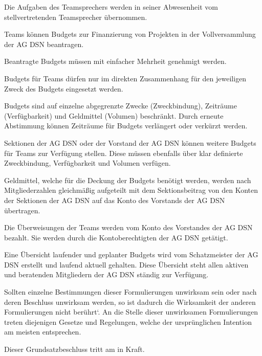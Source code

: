 \begin{contract}
Die Aufgaben des Teamsprechers werden in seiner Abwesenheit vom stellvertretenden Teamsprecher übernommen.


Teams können Budgets zur Finanzierung von Projekten in der Vollversammlung der AG DSN beantragen.

Beantragte Budgets müssen mit einfacher Mehrheit genehmigt werden.

Budgets für Teams dürfen nur im direkten Zusammenhang für den jeweiligen Zweck des Budgets eingesetzt werden.

Budgets sind auf einzelne abgegrenzte Zwecke (Zweckbindung), Zeiträume (Verfügbarkeit) und Geldmittel (Volumen) beschränkt. Durch erneute Abstimmung können Zeiträume für Budgets verlängert oder verkürzt werden.

Sektionen der AG DSN oder der Vorstand der AG DSN können weitere Budgets für Teams zur Verfügung stellen. Diese müssen ebenfalls über klar definierte Zweckbindung, Verfügbarkeit und Volumen verfügen.

Geldmittel, welche für die Deckung der Budgets benötigt werden, werden nach Mitgliederzahlen gleichmäßig aufgeteilt mit dem Sektionsbeitrag von den Konten der Sektionen der AG DSN auf das Konto des Vorstands der AG DSN übertragen.

Die Überweisungen der Teams werden vom Konto des Vorstandes der AG DSN bezahlt. Sie werden durch die Kontoberechtigten der AG DSN getätigt.

Eine Übersicht laufender und geplanter Budgets wird vom Schatzmeister der AG DSN erstellt und laufend aktuell gehalten. Diese Übersicht steht allen aktiven und beratenden Mitgliedern der AG DSN ständig zur Verfügung.

Sollten einzelne Bestimmungen dieser Formulierungen unwirksam sein oder nach deren Beschluss unwirksam werden, so ist dadurch die Wirksamkeit der anderen Formulierungen nicht berührt`. An die Stelle dieser unwirksamen Formulierungen treten diejenigen Gesetze und Regelungen, welche der ursprünglichen Intention am meisten entsprechen.

Dieser Grundsatzbeschluss tritt am  in Kraft.
\end{contract}


